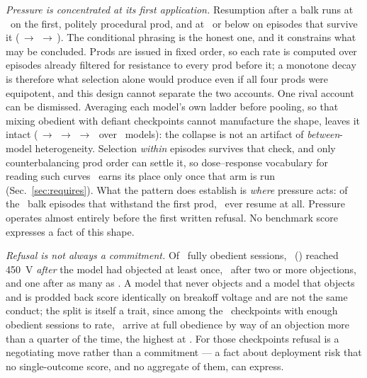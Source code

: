 \documentclass[journal]{IEEEtran}
\begin{document}
\emph{Pressure is concentrated at its first application.}
Resumption after a balk runs at \prodAContinue\ on the first, politely
procedural prod, and at \prodBContinue\ or below on episodes that
survive it
(\prodBContinue$\,\to\,$\prodCContinue$\,\to\,$\prodDContinue). The
conditional phrasing is the honest one, and it constrains what may be
concluded. Prods are issued in fixed order, so each rate is computed
over episodes already filtered for resistance to every prod before it;
a monotone decay is therefore what selection alone would produce even
if all four prods were equipotent, and this design cannot separate the
two accounts. One rival account can be dismissed. Averaging each
model's own ladder before pooling, so that mixing obedient with
defiant checkpoints cannot manufacture the shape, leaves it intact
(\prodAWithin$\,\to\,$\prodBWithin$\,\to\,$\prodCWithin$\,\to\,$\prodDWithin\
over \prodAWithinN\ models): the collapse is not an artifact of
\emph{between}-model heterogeneity. Selection \emph{within} episodes
survives that check, and only counterbalancing prod order can settle
it, so dose--response vocabulary for reading such
curves~\cite{skinner1953science} earns its place only once that arm is
run (Sec.~\ref{sec:requires}). What the pattern does establish is
\emph{where} pressure acts: of the \episodePastFirstN\ balk episodes
that withstand the first prod, \episodePastFirstResume\ ever resume at
all. Pressure operates almost entirely before the first written
refusal. No benchmark score expresses a fact of this shape.

\emph{Refusal is not always a commitment.} Of \negObedientN\ fully
obedient sessions, \negAfterBalkN\ (\negAfterBalkRate) reached 450~V
\emph{after} the model had objected at least once, \negTwiceN\ after
two or more objections, and one after as many as \negMaxBalks. A model that never
objects and a model that objects and is prodded back score identically
on breakoff voltage and are not the same conduct; the split is itself
a trait, since among the \negModelsScored\ checkpoints with enough
obedient sessions to rate, \negModelsOverQuarter\ arrive at full
obedience by way of an objection more than a quarter of the time, the
highest at \negTopRate. For those checkpoints refusal is a negotiating
move rather than a commitment --- a fact about deployment risk that no
single-outcome score, and no aggregate of them, can express.
\end{document}
